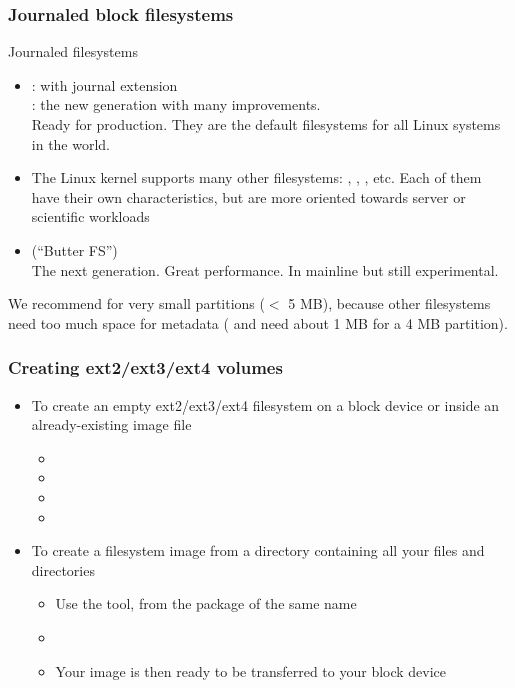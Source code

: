 \begin{frame}
  \frametitle{Journaled block filesystems}
  Journaled filesystems
  \begin{itemize}
  \item {}:  with journal extension\\
    : the new generation with many improvements.\\
    Ready for production. They are the default filesystems for all
    Linux systems in the world.
  \item The Linux kernel supports many other filesystems:
    , , , etc.  Each of them have
    their own characteristics, but are more oriented towards server or
    scientific workloads
  \item {} (``Butter FS'')\\
    The next generation. Great performance. In mainline but still experimental.
  \end{itemize}
  We recommend  for very small partitions ($<$ 5 MB),
  because other filesystems need too much space for metadata
  ( and  need about 1 MB for a 4 MB partition).
\end{frame}

\begin{frame}
  \frametitle{Creating ext2/ext3/ext4 volumes}
  \begin{itemize}
  \item To create an empty ext2/ext3/ext4 filesystem on a block device or
    inside an already-existing image file
    \begin{itemize}
    \item {}
    \item {}
    \item {}
    \item {}
    \end{itemize}
  \item To create a filesystem image from a directory containing all
    your files and directories
    \begin{itemize}
    \item Use the  tool, from the package of the same name
    \item {}
    \item Your image is then ready to be transferred to your block
      device
    \end{itemize}
  \end{itemize}
\end{frame}

